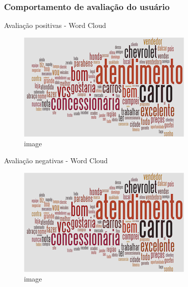 \begin{frame}\frametitle{Comportamento de avaliação do usuário}

\begin{block}{Avaliação positivas - Word Cloud}

\begin{figure}[htbp]
\centering
\includegraphics{tagpositivo.png}
\caption{image}
\end{figure}

\end{block}

\begin{block}{Avaliação negativas - Word Cloud}

\begin{figure}[htbp]
\centering
\includegraphics{tagpositivo.png}
\caption{image}
\end{figure}

\end{block}

\end{frame}
